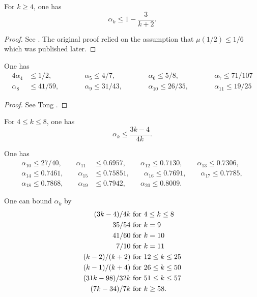 \begin{lemma}\label{hl-alpha}
For $k \ge 4$, one has
\[
\alpha_k \leq 1 - \frac{3}{k + 2}.
\]
\end{lemma}
\begin{proof}
See \cite{hardy_littlewood_approximate_1923}. The original proof relied on the assumption that $\mu(1/2) \le 1/6$ which was published later.
\end{proof}

\begin{lemma}
One has
\begin{alignat*}{4}
\alpha_4 &\le 1/2,\qquad &&\alpha_5 \le 4/7,\qquad &&\alpha_6 \le 5/8,\qquad &&\alpha_7 \le 71/107\\
\alpha_8 &\le 41/59,\qquad &&\alpha_9 \le 31/43,\qquad &&\alpha_{10} \le 26/35,\qquad &&\alpha_{11}\le 19/25
\end{alignat*}
\end{lemma}
\begin{proof}
See Tong \cite{Tong_divisor}.
\end{proof}

\begin{theorem}\cite{heathbrown_mean_1981} For $4 \le k \le 8$, one has
\[
\alpha_k \leq \frac{3k-4}{4k}.
\]
\end{theorem}

\begin{theorem}\cite{ivic_ouellet_1989} One has
\begin{align*}
\alpha_{10} \le 27/40,\qquad \alpha_{11} &\le 0.6957,\qquad \alpha_{12} \le 0.7130,\qquad \alpha_{13} \le 0.7306,\\
\alpha_{14} \le 0.7461,\qquad \alpha_{15} &\le 0.75851,\qquad \alpha_{16} \le 0.7691,\qquad \alpha_{17} \le 0.7785,\\
\alpha_{18} \le 0.7868,\qquad \alpha_{19} &\le 0.7942,\qquad \alpha_{20} \le 0.8009.
\end{align*}
\end{theorem}
\begin{theorem}\cite[Theorem 13.12]{ivic}  One can bound $\alpha_k$ by
    \begin{align*}
        (3k-4)/4k & \hbox{ for } 4 \leq k \leq 8 \\
        35/54 & \hbox{ for } k = 9 \\
        41/60 & \hbox{ for } k = 10 \\
        7/10 & \hbox{ for } k = 11 \\
        (k-2)/(k+2) & \hbox{ for } 12 \leq k \leq 25 \\
        (k-1)/(k+4) & \hbox{ for } 26 \leq k \leq 50 \\
        (31k-98)/32k & \hbox{ for } 51 \leq k \leq 57 \\
        (7k-34)/7k & \hbox{ for } k \geq 58.
    \end{align*}
\end{theorem}

